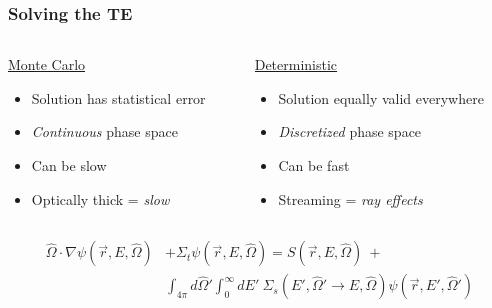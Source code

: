 \documentclass[handout]{beamer}
\renewcommand{\(}{\begin{columns}}
\renewcommand{\)}{\end{columns}}
\newcommand{\<}[1]{\begin{column}{#1}}
\renewcommand{\>}{\end{column}}
\newcommand{\vOmega}{\ensuremath{\hat{\Omega}}}
\begin{document}
\begin{frame}[fragile]
  \frametitle{Solving the TE}
%
\begin{columns}
  \begin{column}{0.5\textwidth}
  \begin{center}
  \underline{Monte Carlo}
  \end{center}
	\begin{itemize}
	\item Solution has statistical error
	\item \textit{Continuous} phase space%
	\item Can be slow
	\item Optically thick = \textit{slow}
	\end{itemize}
  \end{column}
  \begin{column}{0.5\textwidth}
  \begin{center}
  \underline{Deterministic}
  \end{center}
	\begin{itemize}
	\item Solution equally valid everywhere
	\item \textit{Discretized} phase space%
	\item Can be fast
	\item Streaming = \textit{ray effects}
	\end{itemize}
  \end{column}
\end{columns}
%
\begin{align}
\vOmega \cdot \nabla \psi(\vec{r}, E, \vOmega) &+
\Sigma_t \psi(\vec{r}, E, \vOmega) = S(\vec{r}, E, \vOmega) \:+\nonumber\\
%
& \int_{4\pi} d\vOmega' \int_0^{\infty} dE'\: \Sigma_s(E', \vOmega' \rightarrow E, \vOmega) \psi(\vec{r}, E', \vOmega') \nonumber
\end{align}

\end{frame}
\end{document}
